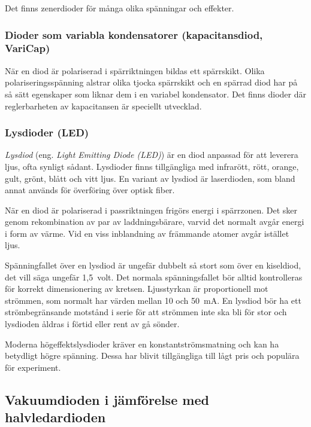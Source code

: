   Det finns zenerdioder för många olika spänningar och effekter.

\subsubsection{Dioder som variabla kondensatorer (kapacitansdiod, VariCap)}
\label{varicap}

  När en diod är polariserad i spärriktningen bildas ett spärrskikt.
  Olika polariseringsspänning alstrar olika tjocka spärrskikt och en spärrad diod
  har på så sätt egenskaper som liknar dem i en variabel kondensator.
  Det finns dioder där reglerbarheten av kapacitansen är speciellt utvecklad.

\newpage
\subsubsection{Lysdioder (LED)}
\label{diod_led}

\emph{Lysdiod} (eng. \emph{Light Emitting Diode (LED)}) är en diod anpassad för
att leverera ljus, ofta synligt sådant.
Lysdioder finns tillgängliga med infrarött, rött, orange, gult, grönt,
blått och vitt ljus.
En variant av lysdiod är laserdioden, som bland annat används för överföring
över optisk fiber.

När en diod är polariserad i passriktningen frigörs energi i spärrzonen.
Det sker genom rekombination av par av laddningsbärare, varvid det normalt avgår
energi i form av värme.
Vid en viss inblandning av främmande atomer avgår istället ljus.

Spänningfallet över en lysdiod är ungefär dubbelt så stort som över en
kiseldiod, det vill säga ungefär 1,5~volt.
Det normala spänningsfallet bör alltid kontrolleras för korrekt dimensionering
av kretsen.
Ljusstyrkan är proportionell mot strömmen, som normalt har värden mellan 10 och
\qty{50}{\milli\ampere}.
En lysdiod bör ha ett strömbegränsande motstånd i serie för att strömmen
inte ska bli för stor och lysdioden åldras i förtid eller rent av gå sönder.

Moderna högeffektslysdioder kräver en konstant\-strömsmatning och kan ha betydligt
högre spänning.
Dessa har blivit tillgängliga till lågt pris och populära för experiment.

\subsection{Vakuumdioden i jämförelse med halvledardioden}

